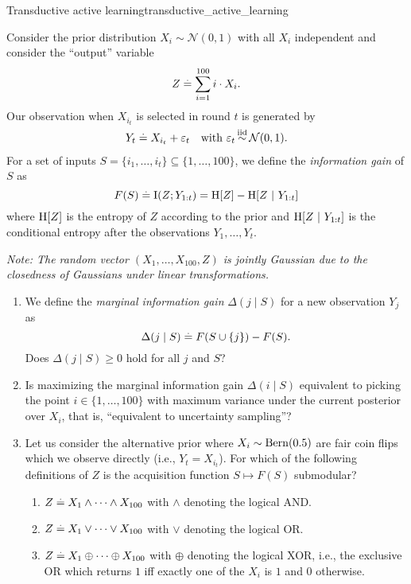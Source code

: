 \begin{nexercise}{Transductive active learning}{transductive_active_learning}



  Consider the prior distribution \(X_i \sim \mathcal{N}(0,1)\) with all \(X_i\) independent and consider the ``output'' variable \begin{align*}
    Z \overset{.}{=} \sum_{i=1}^{100} i \cdot X_i.
  \end{align*}
  Our observation when \(X_{i_t}\) is selected in round \(t\) is generated by \begin{align*}
    Y_t \overset{.}{=} X_{i_t} + \varepsilon_t \quad\text{with } \varepsilon_t \operatorname*{\smash{\overset{\mathrm{iid}}{\sim}}} \mathcal{N}(0,1).
  \end{align*}
  For a set of inputs \(S = \{i_1, \dots, i_t\} \subseteq \{1, \dots, 100\}\), we define the \emph{information gain} of \(S\) as \[
      F(S) \defeq \I{Z}{Y_{1:t}} = \H{Z} - \H{Z}[Y_{1:t}]
  \] where \(\H{Z}\) is the entropy of \(Z\) according to the prior and \(\H{Z}[Y_{1:t}]\) is the conditional entropy after the observations \(Y_1, \dots, Y_t\).\par
  \emph{Note: The random vector \((X_1, \dots, X_{100}, Z)\) is jointly Gaussian due to the closedness of Gaussians under linear transformations.}

  \begin{enumerate}
    \item We define the \emph{marginal information gain} \(\Delta(j \mid S)\) for a new observation \(Y_j\) as \[
      \Delta(j \mid S) \overset{.}{=} F(S \cup \{j\}) - F(S).
    \]
    Does \({\Delta(j \mid S) \geq 0}\) hold for all $j$ and $S$?

    \item Is maximizing the marginal information gain \(\Delta(i \mid S)\) equivalent to picking the point \(i \in \{1, \dots, 100\}\) with maximum variance under the current posterior over \(X_i\), that is, ``equivalent to uncertainty sampling''?

    \item Let us consider the alternative prior where \(X_i \sim \Bern{0.5}\) are fair coin flips which we observe directly (i.e., \(Y_t = X_{i_t}\)).
    For which of the following definitions of \(Z\) is the acquisition function \(S \mapsto F(S)\) submodular? \begin{enumerate}
        \item \(Z \overset{.}{=} X_1 \land \cdots \land X_{100}\) with \(\land\) denoting the logical AND.
        \item \(Z \overset{.}{=} X_1 \lor \cdots \lor X_{100}\) with \(\lor\) denoting the logical OR.
        \item \(Z \overset{.}{=} X_1 \oplus \cdots \oplus X_{100}\) with \(\oplus\) denoting the logical XOR, i.e., the exclusive OR which returns \(1\) iff exactly one of the \(X_i\) is \(1\) and \(0\) otherwise.
    \end{enumerate}
  \end{enumerate}
\end{nexercise}
